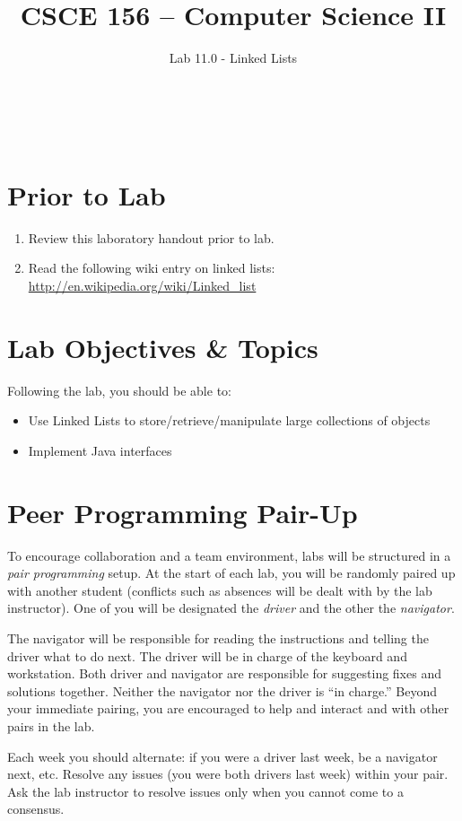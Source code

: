 \documentclass[12pt]{scrartcl}
\title{CSCE 156 -- Computer Science II}
\subtitle{Lab 11.0 - Linked Lists}
\author{~}
\date{~}
\begin{document}
\maketitle

\section*{Prior to Lab}

\begin{enumerate}
  \item Review this laboratory handout prior to lab.
  \item Read the following wiki entry on linked lists: \\
	\url{http://en.wikipedia.org/wiki/Linked_list}
\end{enumerate}

\section*{Lab Objectives \& Topics}
Following the lab, you should be able to:
\begin{itemize}
  \item Use Linked Lists to store/retrieve/manipulate large 
  	collections of objects
  \item Implement Java interfaces
\end{itemize}


\section*{Peer Programming Pair-Up}

To encourage collaboration and a team environment, labs will be
structured in a \emph{pair programming} setup.  At the start of
each lab, you will be randomly paired up with another student 
(conflicts such as absences will be dealt with by the lab instructor).
One of you will be designated the \emph{driver} and the other
the \emph{navigator}.  

The navigator will be responsible for reading the instructions and
telling the driver what to do next.  The driver will be in charge of the
keyboard and workstation.  Both driver and navigator are responsible
for suggesting fixes and solutions together.  Neither the navigator
nor the driver is ``in charge.''  Beyond your immediate pairing, you
are encouraged to help and interact and with other pairs in the lab.

Each week you should alternate: if you were a driver last week, 
be a navigator next, etc.  Resolve any issues (you were both drivers
last week) within your pair.  Ask the lab instructor to resolve issues
only when you cannot come to a consensus.  
\end{document}
